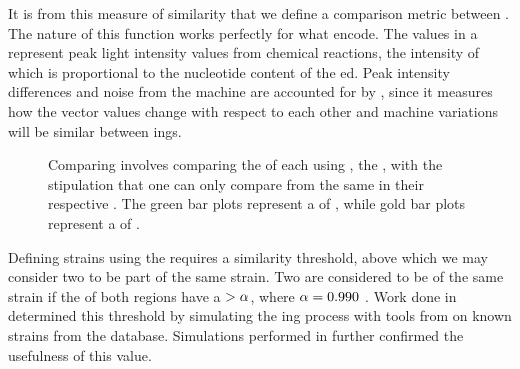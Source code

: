 It is from this measure of similarity \pcfunclabel{} that we define a comparison metric between \pyros{}.
The nature of this function works perfectly for what \pyros{} encode.
The values in a \pyro{} represent peak light intensity values from chemical reactions, the intensity of which is proportional to the nucleotide content of the \dna{} \pyro{}ed.
Peak intensity differences and noise from the machine are accounted for by \pearson{}, since it measures how the \pyro{} vector values change with respect to each other and machine variations will be similar between \pyro{}ings.

\begin{figure}
    \centering
    
    
    
    \caption{Comparing \isols{} involves comparing the \pyros{} of each \isol{} using \pcfunclabel{}, the \pearson{}, with the stipulation that one can only compare \pyros{} from the same \itsshort{} in their respective \isol{}. The green bar plots represent a \pyro{} of \Ssixt{}, while gold bar plots represent a \pyro{} of \Sfive{}.}
    \label{fig:isolcompare}
\end{figure}

Defining strains using the \pearson{} requires a similarity threshold, above which we may consider two \isols{} to be part of the same strain.
Two \isols{} are considered to be of the same strain if the \pyros{} of both regions have a $  > \alpha{}$, where $\alpha{} = 0.990$ \cite{Shealy:SeniorProject, Black2014121}.
\index{\a{}}
Work done in \cite{Shealy:SeniorProject} determined this \a{} threshold by simulating the \pyro{}ing process with tools from \cite{montana2013algorithms} on known \ecoli{} strains from the \ncbilong{} database.
Simulations performed in \cite{DBLP:conf/bibm/BrandtMSBGK12} further confirmed the usefulness of this \a{} value.

